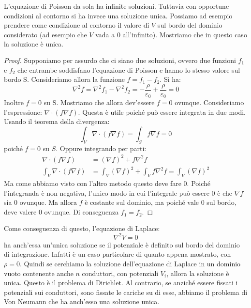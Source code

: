\documentclass{article}
\renewcommand{\epsilon}{\varepsilon}
\newcommand{\ez}{\epsilon_0}
\newcommand{\grad}[1][]{\nabla#1}
\renewcommand{\div}[1][]{\nabla#1 \cdot}
\numberwithin{equation}{section}
\begin{document}
L'equazione di Poisson da sola ha infinite soluzioni. Tuttavia con opportune condizioni al contorno si ha invece una soluzione unica. Possiamo ad esempio prendere come condizione al contorno il valore di $V$ sul bordo del dominio considerato (ad esempio che $V$ vada a 0 all'infinito). Mostriamo che in questo caso la soluzione è unica.
\begin{proof}
    Supponiamo per assurdo che ci siano due soluzioni, ovvero due funzioni $f_1$ e $f_2$ che entrambe soddisfano l'equazione di Poisson e hanno lo stesso valore sul bordo S. Consideriamo allora la funzione $f = f_1-f_2$. Si ha:
    \begin{equation}
        \nabla^2 f = \nabla^2 f_1 - \nabla^2 f_2 = - \frac{ \rho }{ \ez } + \frac{ \rho }{ \ez } = 0
    \end{equation}
    Inoltre $f=0$ su S. Mostriamo che allora dev'essere $f=0$ ovunque. Consideriamo l'espressione: $\div (f \grad f)$. Questa è utile poiché può essere integrata in due modi. Usando il teorema della divergenza: 
    \begin{equation}
        \int_V \div (f \grad f) = \int_S f \grad f = 0
    \end{equation}
    poiché $f=0$ su $S$. Oppure integrando per parti:
    \begin{align}
        \div (f \grad f) &= (\grad f)^2 + f \nabla^2 f \\
        \int_V \div (f \grad f) &= \int_V (\grad f)^2 + \int_V f \nabla^2 f = \int_V (\grad f)^2 
    \end{align}
    Ma come abbiamo visto con l'altro metodo questo deve fare 0. Poiché l'integranda è non negativa, l'unico modo in cui l'integrale può essere 0 è che $\grad f$ sia 0 ovunque. Ma allora $f$ è costante sul dominio, ma poiché vale 0 sul bordo, deve valere 0 ovunque. Di conseguenza $f_1=f_2$.
\end{proof}
Come conseguenza di questo, l'equazione di Laplace:
\begin{equation}
    \nabla^2 V = 0
\end{equation}
ha anch'essa un'unica soluzione se il potenziale è definito sul bordo del dominio di integrazione. Infatti è un caso particolare di quanto appena mostrato, con $\rho = 0$. Quindi se cerchiamo la soluzione dell'equazione di Laplace in un dominio vuoto contenente anche $n$ conduttori, con potenziali $V_i$, allora la soluzione è unica. Questo è il problema di Dirichlet. Al contrario, se anziché essere fissati i potenziali sui conduttori, sono fissate le cariche su di esse, abbiamo il problema di Von Neumann che ha anch'esso una soluzione unica. 
\end{document}

